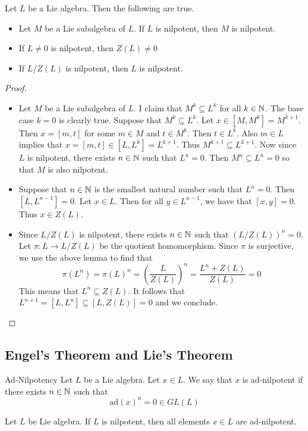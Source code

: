 \documentclass[a4paper]{article}
\begin{document}
\begin{lmm}{}{} Let $L$ be a Lie algebra. Then the following are true. 
\begin{itemize}
\item Let $M$ be a Lie subalgebra of $L$. If $L$ is nilpotent, then $M$ is nilpotent. 
\item If $L\neq 0$ is nilpotent, then $Z(L)\neq 0$
\item If $L/Z(L)$ is nilpotent, then $L$ is nilpotent. 
\end{itemize} \tcbline
\begin{proof}~\\
\begin{itemize}
\item Let $M$ be a Lie subalgebra of $L$. I claim that $M^k\subseteq L^k$ for all $k\in\mathbb{N}$. The base case $k=0$ is clearly true. Suppose that $M^k\subseteq L^k$. Let $x\in[M,M^k]=M^{k+1}$. Then $x=[m,t]$ for some $m\in M$ and $t\in M^k$. Then $t\in L^k$. Also $m\in L$ implies that $x=[m,t]\in[L,L^k]=L^{k+1}$. Thus $M^{k+1}\subseteq L^{k+1}$. Now since $L$ is nilpotent, there exists $n\in\mathbb{N}$ such that $L^n=0$. Then $M^n\subseteq L^n=0$ so that $M$ is also nilpotent. 
\item Suppose that $n\in\mathbb{N}$ is the smallest natural number such that $L^n=0$. Then $[L,L^{n-1}]=0$. Let $x\in L$. Then for all $y\in L^{n-1}$, we have that $[x,y]=0$. Thus $x\in Z(L)$. 
\item Since $L/Z(L)$ is nilpotent, there exists $n\in\mathbb{N}$ such that $(L/Z(L))^n=0$. Let $\pi:L\to L/Z(L)$ be the quotient homomorphism. Since $\pi$ is surjective, we use the above lemma to find that $$\pi(L^n)=\pi(L)^n=\left(\frac{L}{Z(L)}\right)^n=\frac{L^n+Z(L)}{Z(L)}=0$$ This means that $L^n\subseteq Z(L)$. It follows that $L^{n+1}=[L,L^n]\subseteq[L,Z(L)]=0$ and we conclude. 
\end{itemize}
\end{proof}
\end{lmm}

\subsection{Engel's Theorem and Lie's Theorem}
\begin{defn}{Ad-Nilpotency}{} Let $L$ be a Lie algebra. Let $x\in L$. We say that $x$ is ad-nilpotent if there exists $n\in\mathbb{N}$ such that $$\text{ad}(x)^n=0\in GL(L)$$
\end{defn}

\begin{lmm}{}{} Let $L$ be Lie algebra. If $L$ is nilpotent, then all elements $x\in L$ are ad-nilpotent. 
\end{lmm}
\end{document}
